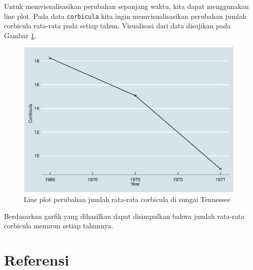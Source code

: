 \documentclass[]{book}
\newenvironment{Shaded}{\begin{snugshade}}{\end{snugshade}}
\newcommand{\KeywordTok}[1]{\textcolor[rgb]{0.13,0.29,0.53}{\textbf{#1}}}
\newcommand{\DataTypeTok}[1]{\textcolor[rgb]{0.13,0.29,0.53}{#1}}
\newcommand{\DecValTok}[1]{\textcolor[rgb]{0.00,0.00,0.81}{#1}}
\newcommand{\StringTok}[1]{\textcolor[rgb]{0.31,0.60,0.02}{#1}}
\newcommand{\OperatorTok}[1]{\textcolor[rgb]{0.81,0.36,0.00}{\textbf{#1}}}
\newcommand{\NormalTok}[1]{#1}
\begin{document}
Untuk memvisualisasikan perubahan sepanjang waktu, kita dapat
menggunakan line plot. Pada data \texttt{corbicula} kita ingin
memvisualisasikan perubahan jumlah corbicula rata-rata pada setiap
tahun. Visualisasi dari data disajikan pada Gambar \ref{fig:lineeda}.

\begin{Shaded}
\end{Shaded}

\begin{figure}

{\centering \includegraphics[width=0.7\linewidth]{EnvStat_files/figure-latex/lineeda-1} 

}

\caption{Line plot perubahan jumlah rata-rata corbicula di sungai Tennessee}\label{fig:lineeda}
\end{figure}

Berdasarkan garfik yang dihasilkan dapat disimpulkan bahwa jumlah
rata-rata corbicula menurun setiap tahunnya.

\section{Referensi}\label{referensi-6}
\end{document}

